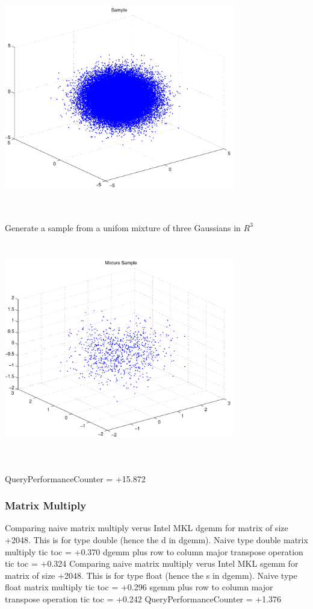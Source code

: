 \documentclass[9pt]{article}
\theoremstyle{plain}
\theoremstyle{definition}
\theoremstyle{remark}
\numberwithin{equation}{section}
\begin{document}
\includegraphics[width=10.0cm,height=10.0cm]{R_3_Normal.pdf}

Generate a sample from a unifom mixture of three Gaussians in $R^3$
\includegraphics[width=10.0cm,height=10.0cm]{R_3_Normal_Mixture.pdf}

QueryPerformanceCounter  =  +15.872
\subsubsection{Matrix Multiply}
Comparing naive matrix multiply verus Intel MKL dgemm for matrix of size +2048.
This is for type double (hence the d in dgemm).
Naive type double matrix multiply tic toc  =  +0.370
dgemm plus row to column major transpose operation tic toc  =  +0.324
Comparing naive matrix multiply verus Intel MKL sgemm for matrix of size +2048.
This is for type float (hence the s in dgemm).
Naive type float matrix multiply tic toc  =  +0.296
sgemm plus row to column major transpose operation tic toc  =  +0.242
QueryPerformanceCounter  =  +1.376
\end{document}
